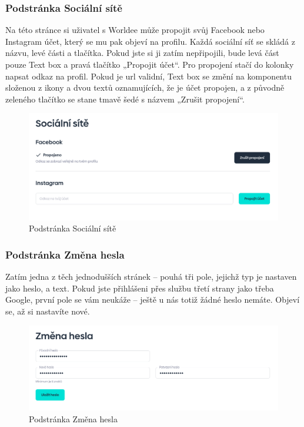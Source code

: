 \newpage
\subsubsection{Podstránka Sociální sítě}
Na této stránce si uživatel s Worldee může propojit svůj Facebook nebo Instagram účet, který se mu pak objeví na profilu. Každá sociální síť se skládá z názvu, levé části a tlačítka. Pokud jste si ji zatím nepřipojili, bude levá část pouze Text box a pravá tlačítko „Propojit účet“. Pro propojení stačí do kolonky napsat odkaz na profil. Pokud je url validní, Text box se změní na komponentu složenou z ikony a dvou textů oznamujících, že je účet propojen, a z původně zeleného tlačítko se stane tmavě šedé s názvem „Zrušit propojení“.

\begin{figure}[!h]
    \centering
    \includegraphics[width=1\linewidth]{obrazky/social_networks.png}
    \caption{Podstránka Sociální sítě}
\end{figure}


\newpage
\subsubsection{Podstránka Změna hesla}
Zatím jedna z těch jednodušších stránek – pouhá tři pole, jejichž typ je nastaven jako heslo, a text. Pokud jste přihlášeni přes službu třetí strany jako třeba Google, první pole se vám neukáže – ještě u nás totiž žádné heslo nemáte. Objeví se, až si nastavíte nové.

\begin{figure}[!h]
    \centering
    \includegraphics[width=1\linewidth]{obrazky/change_password.png}
    \caption{Podstránka Změna hesla}
\end{figure}


